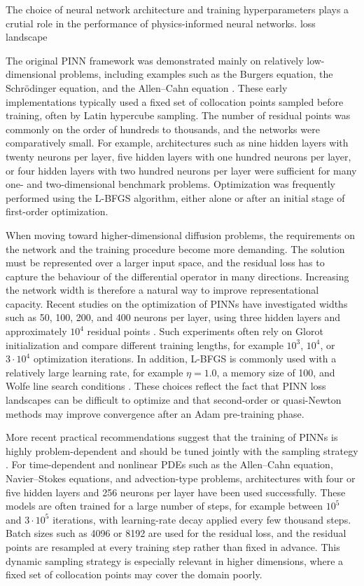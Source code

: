 


The choice of neural network architecture and training hyperparameters plays a crutial role in the performance of physics-informed neural networks.
loss landscape

The original PINN framework was demonstrated mainly on relatively low-dimensional problems, including examples such as the Burgers equation, the Schrödinger equation, and the Allen--Cahn equation \cite{pinns_original}. These early implementations typically used a fixed set of collocation points sampled before training, often by Latin hypercube sampling. The number of residual points was commonly on the order of hundreds to thousands, and the networks were comparatively small. For example, architectures such as nine hidden layers with twenty neurons per layer, five hidden layers with one hundred neurons per layer, or four hidden layers with two hundred neurons per layer were sufficient for many one- and two-dimensional benchmark problems. Optimization was frequently performed using the L-BFGS algorithm, either alone or after an initial stage of first-order optimization.

When moving toward higher-dimensional diffusion problems, the requirements on the network and the training procedure become more demanding. The solution must be represented over a larger input space, and the residual loss has to capture the behaviour of the differential operator in many directions. Increasing the network width is therefore a natural way to improve representational capacity. Recent studies on the optimization of PINNs have investigated widths such as 50, 100, 200, and 400 neurons per layer, using three hidden layers and approximately $10^4$ residual points \cite{loss_landscape}. Such experiments often rely on Glorot initialization and compare different training lengths, for example $10^3$, $10^4$, or $3 \cdot 10^4$ optimization iterations. In addition, L-BFGS is commonly used with a relatively large learning rate, for example $\eta = 1.0$, a memory size of 100, and Wolfe line search conditions \cite{loss_landscape}. These choices reflect the fact that PINN loss landscapes can be difficult to optimize and that second-order or quasi-Newton methods may improve convergence after an Adam pre-training phase.

More recent practical recommendations suggest that the training of PINNs is highly problem-dependent and should be tuned jointly with the sampling strategy \cite{experts_guide}. For time-dependent and nonlinear PDEs such as the Allen--Cahn equation, Navier--Stokes equations, and advection-type problems, architectures with four or five hidden layers and 256 neurons per layer have been used successfully. These models are often trained for a large number of steps, for example between $10^5$ and $3 \cdot 10^5$ iterations, with learning-rate decay applied every few thousand steps. Batch sizes such as 4096 or 8192 are used for the residual loss, and the residual points are resampled at every training step rather than fixed in advance. This dynamic sampling strategy is especially relevant in higher dimensions, where a fixed set of collocation points may cover the domain poorly.


